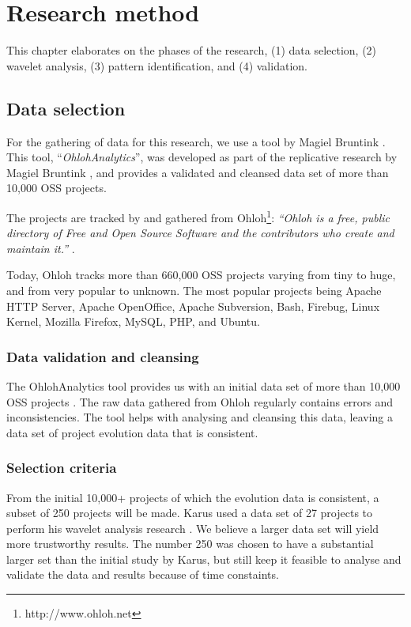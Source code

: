 \chapter{Research method}
\label{method}

This chapter elaborates on the phases of the research, (1) data selection, (2)
wavelet analysis, (3) pattern identification, and (4) validation.

\section{Data selection}
\label{method:data}

For the gathering of data for this research, we use a tool by Magiel Bruntink
\cite{ohlohanalytics}. This tool, ``\emph{OhlohAnalytics}\rm'', was developed as
part of the replicative research by Magiel Bruntink \cite{bruntink2014}, and
provides a validated and cleansed data set of more than 10,000 OSS projects.

The projects are tracked by and gathered from
Ohloh\footnote{http://www.ohloh.net}: \emph{``Ohloh is a free, public directory
of Free and Open Source Software and the contributors who create and maintain
it.'' }\rm \cite{ohloh}.

Today, Ohloh tracks more than 660,000 OSS projects varying from tiny to huge,
and from very popular to unknown. The most popular projects being Apache HTTP
Server, Apache OpenOffice, Apache Subversion, Bash, Firebug, Linux Kernel,
Mozilla Firefox, MySQL, PHP, and Ubuntu.

\subsection{Data validation and cleansing}
The OhlohAnalytics tool provides us with an initial data set of more than
10,000 OSS projects \cite{bruntink2014}. The raw data gathered from Ohloh
regularly contains errors and inconsistencies. The tool helps with analysing
and cleansing this data, leaving a data set of project evolution data that is
consistent.



\subsection{Selection criteria}

From the initial 10,000+ projects of which the evolution data is consistent, a
subset of 250 projects will be made. Karus used a data set of 27 projects to
perform his wavelet analysis research \cite{karus2013}. We believe a larger
data set will yield more trustworthy results. The number 250 was chosen to have
a substantial larger set than the initial study by Karus, but still keep it
feasible to analyse and validate the data and results because of time
constaints.

